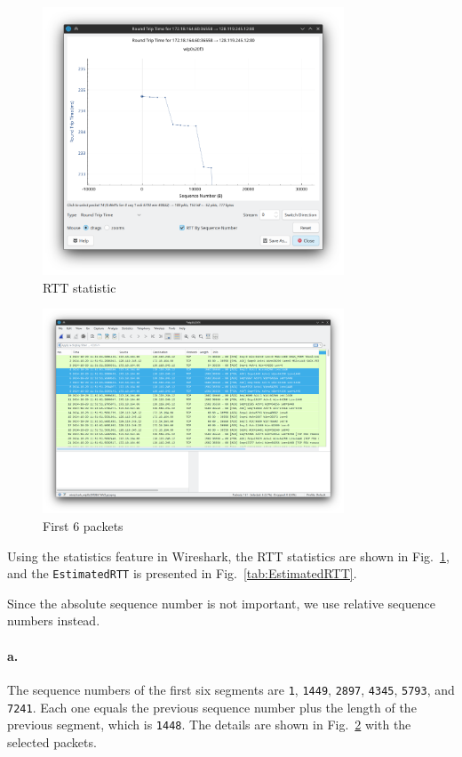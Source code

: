\documentclass{cshwk}
\begin{document}
\begin{figure}[htbp]
    \centering
    \includegraphics[width=0.8\textwidth]{./lab3-5.png}
    \caption{RTT statistic}
    \label{fig:RTT}
\end{figure}

\begin{figure}[htbp]
    \centering
    \includegraphics[width=0.8\textwidth]{./lab3-6.png}
    \caption{First 6 packets}
    \label{fig:6packets}
\end{figure}

Using the statistics feature in Wireshark, the RTT statistics are shown in Fig.~\ref{fig:RTT}, and the \texttt{EstimatedRTT} is presented in Fig.~\ref{tab:EstimatedRTT}.

Since the absolute sequence number is not important, we use relative sequence numbers instead.

\paragraph{a.} The sequence numbers of the first six segments are \texttt{1}, \texttt{1449}, \texttt{2897}, \texttt{4345}, \texttt{5793}, and \texttt{7241}. Each one equals the previous sequence number plus the length of the previous segment, which is \texttt{1448}. The details are shown in Fig.~\ref{fig:6packets} with the selected packets.
\end{document}
